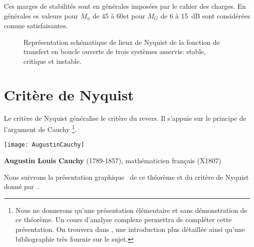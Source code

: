 Ces marges de stabilités sont en générales imposées par le cahier des charges.
En générales es valeurs pour $M_{\phi}$ de 45 à 60\degree et
pour $M_G$ de 6 à 15~\si{\dB} sont considérées comme satisfaisantes.
\begin{figure}[!h]
    \centering
    
    \caption{Représentation schématique de lieux de Nyquist de la fonction 
             de transfert en boucle ouverte de trois systèmes asservis: 
             stable, critique et instable. \label{fig-nyquist_revers}}
\end{figure}
\newpage
{}
\captionsetup{width=0.9\linewidth}
\section{Critère de Nyquist}
Le critère de Nyquist généralise le critère du revers.
Il s'appuie sur le principe de l'argument de Cauchy
\footnote{Nous ne donnerons qu'une présentation élémentaire et sans 
démonstration de ce théorème. Un cours d'analyse complexe permettra de 
compléter cette présentation. On trouvera dans \cite{laas_pc7bis,reg}, 
une introduction plus détaillée ainsi qu'une bibliographie très fournie 
sur le sujet.}.
\begin{marginfigure}
    \centering
    \texttt{[image: AugustinCauchy]} 
    \caption*{\textbf{Augustin Louis Cauchy} 
              (1789-1857), mathématicien français (X1807)}
\end{marginfigure}
Nous suivrons la présentation \og graphique\fg~ de ce théorème 
et du critère de Nyquist donné par~\cite{reg}. 
